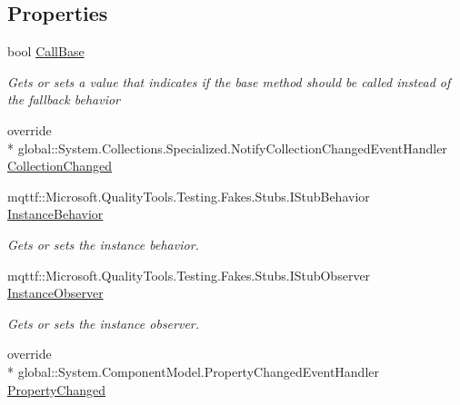 \subsection*{Properties}
\begin{DoxyCompactItemize}
\item 
bool \hyperlink{class_system_1_1_collections_1_1_object_model_1_1_fakes_1_1_stub_observable_collection_3_01_t_01_4_ac4f4b22c6a3f92bc29eb4119ccd3fdbe}{Call\-Base}
\begin{DoxyCompactList}\small\item\em Gets or sets a value that indicates if the base method should be called instead of the fallback behavior\end{DoxyCompactList}\item 
override \\*
global\-::\-System.\-Collections.\-Specialized.\-Notify\-Collection\-Changed\-Event\-Handler \hyperlink{class_system_1_1_collections_1_1_object_model_1_1_fakes_1_1_stub_observable_collection_3_01_t_01_4_a387157f86053dc42fa70e43492802296}{Collection\-Changed}
\item 
mqttf\-::\-Microsoft.\-Quality\-Tools.\-Testing.\-Fakes.\-Stubs.\-I\-Stub\-Behavior \hyperlink{class_system_1_1_collections_1_1_object_model_1_1_fakes_1_1_stub_observable_collection_3_01_t_01_4_aae4ac23e2187cae1dfe0f913ec680139}{Instance\-Behavior}
\begin{DoxyCompactList}\small\item\em Gets or sets the instance behavior.\end{DoxyCompactList}\item 
mqttf\-::\-Microsoft.\-Quality\-Tools.\-Testing.\-Fakes.\-Stubs.\-I\-Stub\-Observer \hyperlink{class_system_1_1_collections_1_1_object_model_1_1_fakes_1_1_stub_observable_collection_3_01_t_01_4_a045ed738bd66a15412e373ce3e5e32e4}{Instance\-Observer}
\begin{DoxyCompactList}\small\item\em Gets or sets the instance observer.\end{DoxyCompactList}\item 
override \\*
global\-::\-System.\-Component\-Model.\-Property\-Changed\-Event\-Handler \hyperlink{class_system_1_1_collections_1_1_object_model_1_1_fakes_1_1_stub_observable_collection_3_01_t_01_4_aafdc8d23c06e03566caddcb68d5b9416}{Property\-Changed}
\end{DoxyCompactItemize}


